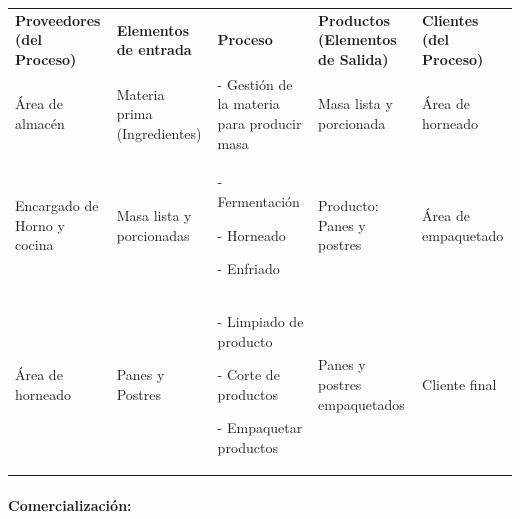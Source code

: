 \documentclass[11pt]{article}
\newcounter{none} %
\begin{document}
{\def\LTcaptype{none} %
\begin{longtable}[]{@{}
  >{\centering\arraybackslash}p{}
  >{\centering\arraybackslash}p{}
  >{\centering\arraybackslash}p{}
  >{\centering\arraybackslash}p{}
  >{\centering\arraybackslash}p{}@{}}
\toprule\noalign{}
\endhead
\bottomrule\noalign{}
\endlastfoot
\textbf{Proveedores (del Proceso)} & \textbf{Elementos de entrada} &
\textbf{Proceso} & \textbf{Productos (Elementos de Salida)} &
\textbf{Clientes (del Proceso)} \\
Área de almacén & Materia prima (Ingredientes) & - Gestión de la materia
para producir masa & Masa lista y porcionada & Área de horneado \\
Encargado de Horno y cocina & Masa lista y porcionadas & - Fermentación

- Horneado

- Enfriado & Producto: Panes y postres & Área de empaquetado \\
Área de horneado & Panes y Postres & - Limpiado de producto

- Corte de productos

- Empaquetar productos & Panes y postres empaquetados & Cliente final \\
\end{longtable}
}

\paragraph{Comercialización:}
\end{document}
